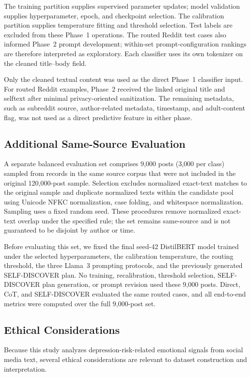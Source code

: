 \documentclass{ieeeaccess}
\begin{document}
The training partition supplies supervised parameter updates; model validation supplies hyperparameter, epoch, and checkpoint selection. The calibration partition supplies temperature fitting and threshold selection. Test labels are excluded from these Phase~1 operations. The routed Reddit test cases also informed Phase~2 prompt development; within-set prompt-configuration rankings are therefore interpreted as exploratory. Each classifier uses its own tokenizer on the cleaned title--body field.

Only the cleaned textual content was used as the direct Phase~1 classifier input. For routed Reddit examples, Phase~2 received the linked original title and selftext after minimal privacy-oriented sanitization. The remaining metadata, such as subreddit source, author-related metadata, timestamp, and adult-content flag, was not used as a direct predictive feature in either phase.

\subsection{Additional Same-Source Evaluation}
A separate balanced evaluation set comprises 9,000 posts (3,000 per class) sampled from records in the same source corpus that were not included in the original 120,000-post sample. Selection excludes normalized exact-text matches to the original sample and duplicate normalized texts within the candidate pool using Unicode NFKC normalization, case folding, and whitespace normalization. Sampling uses a fixed random seed. These procedures remove normalized exact-text overlap under the specified rule; the set remains same-source and is not guaranteed to be disjoint by author or time.

Before evaluating this set, we fixed the final seed-42 DistilBERT model trained under the selected hyperparameters, the calibration temperature, the routing threshold, the three Llama~3 prompting protocols, and the previously generated SELF-DISCOVER plan. No training, recalibration, threshold selection, SELF-DISCOVER plan generation, or prompt revision used these 9,000 posts. Direct, CoT, and SELF-DISCOVER evaluated the same routed cases, and all end-to-end metrics were computed over the full 9,000-post set.

\subsection{Ethical Considerations}

Because this study analyzes depression-risk-related emotional signals from social media text, several ethical considerations are relevant to dataset construction and interpretation.
\end{document}
